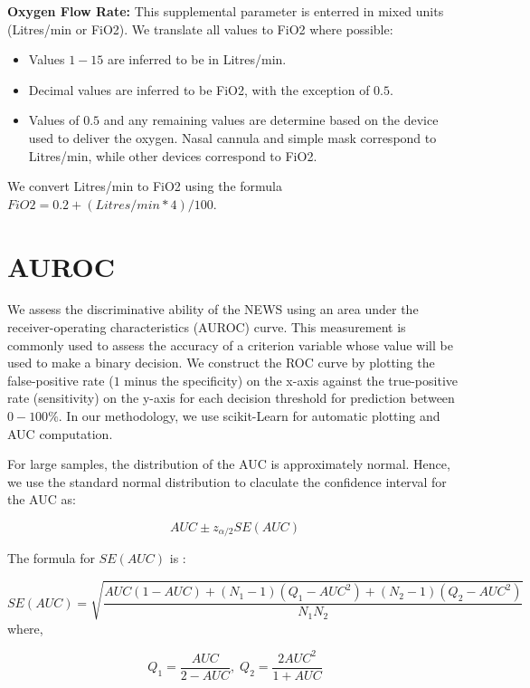 \documentclass[10pt,journal, compsoc]{IEEEtran}
\begin{document}
\textbf{Oxygen Flow Rate: } This supplemental parameter is enterred in mixed units (Litres/min or FiO2). We translate all values to FiO2 where possible:
\begin{itemize}
    \item Values $1-15$ are inferred to be in Litres/min.
    \item Decimal values are inferred to be FiO2, with the exception of $0.5$.
    \item Values of $0.5$ and any remaining values are determine based on the device used to deliver the oxygen. Nasal cannula and simple mask correspond to Litres/min, while other devices correspond to FiO2.
\end{itemize}
We convert Litres/min to FiO2 using the formula $FiO2 = 0.2 + (Litres/min * 4)/100$.

\newpage

\section{AUROC}
\label{appendix:auroc}
We assess the discriminative ability of the NEWS using an area under the receiver-operating characteristics (AUROC) curve. This measurement is commonly used to assess the accuracy of a criterion variable whose value will be used to make a binary decision. We construct the ROC curve by plotting the false-positive rate ($1$ minus the specificity) on the x-axis against the true-positive rate (sensitivity) on the y-axis for each decision threshold for prediction between $0-100\%$. In our methodology, we use scikit-Learn for automatic plotting and AUC computation.

For large samples, the distribution of the AUC is approximately normal. Hence, we use the standard normal distribution to claculate the confidence interval for the AUC as:

\begin{equation}
    AUC \pm z_{\alpha/2}SE(AUC)
\end{equation}

The formula for $SE(AUC)$ is \cite{Hanley82}:

\begin{equation}
    SE(AUC) = \sqrt{\frac{AUC(1-AUC) + (N_1-1)(Q_1-AUC^2) + (N_2-1)(Q_2-AUC^2)}{N_1N_2}}
\end{equation}
where,

\begin{equation}
    Q_1 = \frac{AUC}{2-AUC}, \;
    Q_2 = \frac{2AUC^2}{1+AUC}
\end{equation}
\newpage
\end{document}
